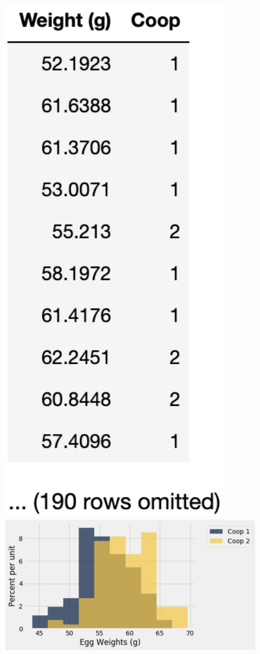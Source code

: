 \includegraphics[scale=.35]{figures/chicken_table.png}
\includegraphics[scale=.55]{figures/chicken_hist.png}

